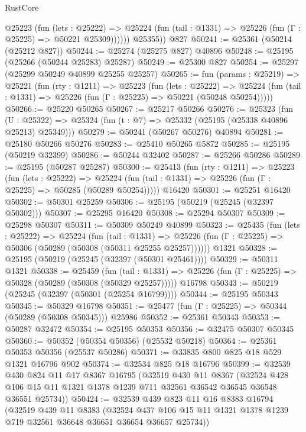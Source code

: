 \begin{lexlean}{RustCore}
\begin{coremodule}
            @25223
              (fun (lets : @25222) =>
              @25224 (fun (tail : @1331) => @25226 (fun (Γ : @25225) => @50221 @25309))))))
        @25355))
    @827
@50241 := @25361 (@50214 (@25212 @827))
@50244 := @25274 (@25275 @827) @40896
@50248 := @25195 (@25266 (@50244 @25283) @25287)
@50249 := @25300 @827
@50254 := @25297 (@25299 @50249 @40899 @25255 @25257)
@50265 := fun (params : @25219) =>
  @25221
    (fun (rty : @1211) =>
    @25223
      (fun (lets : @25222) =>
      @25224 (fun (tail : @1331) => @25226 (fun (Γ : @25225) => @50221 (@50248 @50254)))))
@50266 := @25220 @50265
@50267 := @25217 @50266
@50276 := @25323
    (fun (U : @25322) => @25324 (fun (t : @7) => @25332 (@25195 (@25338 @40896 @25213) @25349)))
@50279 := @50241 (@50267 @50276) @40894
@50281 := @25180 @50266 @50276
@50283 := @25410 @50265 @5872
@50285 := @25195 (@50219 @32399)
@50286 := @50244 @32402
@50287 := @25266 @50286
@50289 := @25195 (@50287 @25287)
@50300 := @25413
    (fun (rty : @1211) =>
    @25223
      (fun (lets : @25222) =>
      @25224 (fun (tail : @1331) => @25226 (fun (Γ : @25225) => @50285 (@50289 @50254)))))
    @16420
@50301 := @25251 @16420
@50302 := @50301 @25259
@50306 := @25195 (@50219 (@25245 (@32397 @50302)))
@50307 := @25295 @16420
@50308 := @25294 @50307
@50309 := @25298 @50307
@50311 := @50309 @50249 @40899
@50323 := @25435
    (fun (lets : @25222) =>
    @25224
      (fun (tail : @1331) =>
      @25226 (fun (Γ : @25225) => @50306 (@50289 (@50308 (@50311 @25255 @25257))))))
    @1321
@50328 := @25195 (@50219 (@25245 (@32397 (@50301 @25461))))
@50329 := @50311 @1321
@50338 := @25459
    (fun (tail : @1331) => @25226 (fun (Γ : @25225) => @50328 (@50289 (@50308 (@50329 @25257)))))
    @16798
@50343 := @50219 (@25245 (@32397 (@50301 (@25254 @16799))))
@50344 := @25195 @50343
@50345 := @50329 @16798
@50351 := @25477 (fun (Γ : @25225) => @50344 (@50289 (@50308 @50345))) @25986
@50352 := @25361 @50343
@50353 := @50287 @32472
@50354 := @25195 @50353
@50356 := @32475 @50307 @50345
@50360 := @50352 (@50354 @50356) (@25532 @50218)
@50364 := @25361 @50353 @50356 (@25537 @50286)
@50371 := @33835 @800 @825 @18 @529 @1321 @16796 @902
@50374 := @32534 @825 @18 @16796
@50399 := @32539
    @430
    @824
    @11
    @17
    @8367
    @16795
    (@32519
      @430
      @11
      @8367
      (@32524 @428 @106 @15 @11 @1321 @1378 @1239 @711 @32561 @36542 @36545 @36548 @36551 @25734))
@50424 := @32539
    @439
    @823
    @11
    @16
    @8383
    @16794
    (@32519
      @439
      @11
      @8383
      (@32524 @437 @106 @15 @11 @1321 @1378 @1239 @719 @32561 @36648 @36651 @36654 @36657 @25734))

\end{coremodule}
\end{lexlean}
